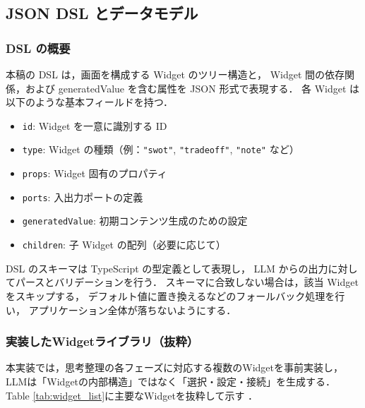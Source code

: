 \documentclass[a4paper,10pt]{jarticle}
\begin{document}
\subsection{JSON DSL とデータモデル}

\subsubsection{DSL の概要}

本稿の DSL は，画面を構成する Widget のツリー構造と，
Widget 間の依存関係，および generatedValue を含む属性を JSON 形式で表現する．
各 Widget は以下のような基本フィールドを持つ．

\begin{itemize}
  \item \texttt{id}: Widget を一意に識別する ID
  \item \texttt{type}: Widget の種類（例：\texttt{"swot"}, \texttt{"tradeoff"}, \texttt{"note"} など）
  \item \texttt{props}: Widget 固有のプロパティ
  \item \texttt{ports}: 入出力ポートの定義
  \item \texttt{generatedValue}: 初期コンテンツ生成のための設定
  \item \texttt{children}: 子 Widget の配列（必要に応じて）
\end{itemize}

DSL のスキーマは TypeScript の型定義として表現し，
LLM からの出力に対してパースとバリデーションを行う．
スキーマに合致しない場合は，該当 Widget をスキップする，
デフォルト値に置き換えるなどのフォールバック処理を行い，
アプリケーション全体が落ちないようにする．


\subsubsection{実装したWidgetライブラリ（抜粋）}
本実装では，思考整理の各フェーズに対応する複数のWidgetを事前実装し，
LLMは「Widgetの内部構造」ではなく「選択・設定・接続」を生成する．
Table \ref{tab:widget_list}に主要なWidgetを抜粋して示す
．
\end{document}
